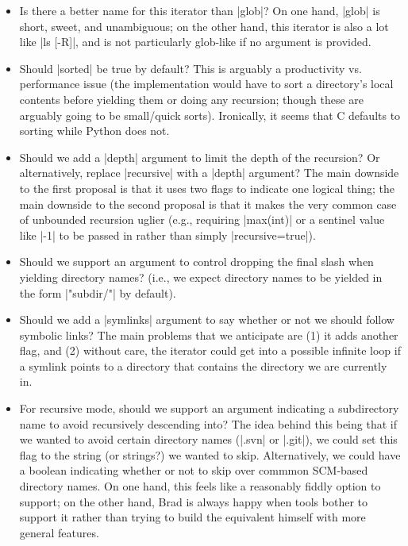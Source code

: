 \documentclass{article}
\begin{document}
\begin{itemize}
\item Is there a better name for this iterator than |glob|?  On one
  hand, |glob| is short, sweet, and unambiguous; on the other hand,
  this iterator is also a lot like |ls [-R]|, and is not particularly
  glob-like if no argument is provided.

\item Should |sorted| be true by default?  This is arguably a
  productivity vs. performance issue (the implementation would have to
  sort a directory's local contents before yielding them or doing any
  recursion; though these are arguably going to be small/quick sorts).
  Ironically, it seems that C defaults to sorting while Python does
  not.

\item Should we add a |depth| argument to limit the depth of the
  recursion?  Or alternatively, replace |recursive| with a |depth|
  argument?  The main downside to the first proposal is that it uses
  two flags to indicate one logical thing; the main downside to the
  second proposal is that it makes the very common case of unbounded
  recursion uglier (e.g., requiring |max(int)| or a sentinel value
  like |-1| to be passed in rather than simply |recursive=true|).

\item Should we support an argument to control dropping the final
  slash when yielding directory names?  (i.e., we expect directory
  names to be yielded in the form |"subdir/"| by default).

\item Should we add a |symlinks| argument to say whether or not we
  should follow symbolic links? The main problems that we anticipate
  are (1) it adds another flag, and (2) without care, the iterator
  could get into a possible infinite loop if a symlink points to a
  directory that contains the directory we are currently in.

\item For recursive mode, should we support an argument indicating a
  subdirectory name to avoid recursively descending into?  The idea
  behind this being that if we wanted to avoid certain directory names
  (\eg |.svn| or |.git|), we could set this flag to the string (or
  strings?) we wanted to skip.  Alternatively, we could have a boolean
  indicating whether or not to skip over commmon SCM-based directory
  names.  On one hand, this feels like a reasonably fiddly option to
  support; on the other hand, Brad is always happy when tools bother
  to support it rather than trying to build the equivalent himself
  with more general features.


\end{itemize}
\end{document}
